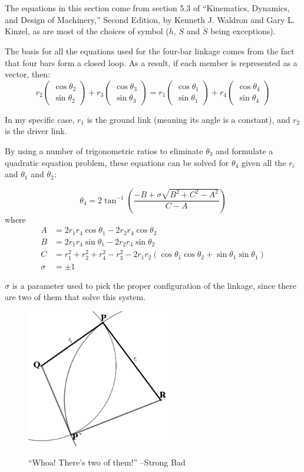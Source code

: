 \documentclass[12pt, letterpaper]{article}
\begin{document}
The equations in this section come from section 5.3 of ``Kinematics, Dynamics, and Design of Machinery,'' Second Edition, by Kenneth J. Waldron and Gary L. Kinzel, as are most of the choices of symbol (\(h\), \(S\) and \(\tilde{S}\) being exceptions).

The basis for all the equations used for the four-bar linkage comes from the fact that four bars form a closed loop. As a result, if each member is represented as a vector, then:
\[r_2\begin{pmatrix}\cos\theta_2 \\ \sin\theta_2\end{pmatrix}+
r_3\begin{pmatrix}\cos\theta_3 \\ \sin\theta_3\end{pmatrix}=
r_1\begin{pmatrix}\cos\theta_1 \\ \sin\theta_1\end{pmatrix}+
r_4\begin{pmatrix}\cos\theta_4 \\ \sin\theta_4\end{pmatrix}\]

In my specific case, \(r_1\) is the ground link (meaning its angle is a constant), and \(r_2\) is the driver link.

By using a number of trigonometric ratios to eliminate \(\theta_3\) and formulate a quadratic equation problem,  these equations can be solved for \(\theta_4\) given all the \(r_i\) and \(\theta_1\) and \(\theta_2\):

\[\theta_4=2\tan^{-1}\left(\frac{-B+\sigma\sqrt{B^2+C^2-A^2}}{C-A}\right)\]
where
\begin{align*}
A&=2r_1r_4\cos\theta_1-2r_2r_4\cos\theta_2\\
B&=2r_1r_4\sin\theta_1-2r_2r_4\sin\theta_2\\
C&=r_1^2+r_2^2+r_4^2-r_3^2-2r_1r_2\left(\cos\theta_1\cos\theta_2+\sin\theta_1\sin\theta_1\right)\\
\sigma&=\pm1
\end{align*}

\(\sigma\) is a parameter used to pick the proper configuration of the linkage, since there are two of them that solve this system.

\begin{figure}[H]
\centering
\caption{``Whoa! There's two of them!'' --Strong Bad}
\includegraphics[width=2.5in]{dyad}
\label{fig:dyad}
\end{figure}
\end{document}
